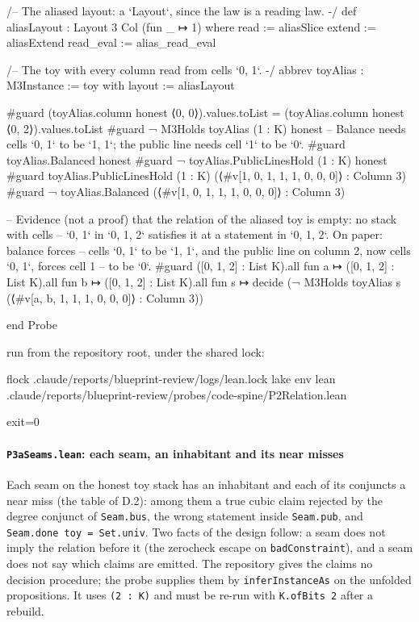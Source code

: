 \begin{leancode}
/-- The aliased layout: a `Layout`, since the law is a reading law. -/
def aliasLayout : Layout 3 Col (fun _ ↦ 1) where
  read := aliasSlice
  extend := aliasExtend
  read_eval := alias_read_eval

/-- The toy with every column read from cells `0, 1`. -/
abbrev toyAlias : M3Instance := { toy with layout := aliasLayout }

#guard (toyAlias.column honest ⟨0, 0⟩).values.toList = (toyAlias.column honest ⟨0, 2⟩).values.toList
#guard ¬ M3Holds toyAlias (1 : K) honest
-- Balance needs cells `0, 1` to be `1, 1`; the public line needs cell `1` to be `0`.
#guard toyAlias.Balanced honest
#guard ¬ toyAlias.PublicLinesHold (1 : K) honest
#guard toyAlias.PublicLinesHold (1 : K) (⟨#v[1, 0, 1, 1, 1, 0, 0, 0]⟩ : Column 3)
#guard ¬ toyAlias.Balanced (⟨#v[1, 0, 1, 1, 1, 0, 0, 0]⟩ : Column 3)

-- Evidence (not a proof) that the relation of the aliased toy is empty: no stack with cells
-- `0, 1` in `{0, 1, 2}` satisfies it at a statement in `{0, 1, 2}`. On paper: balance forces
-- cells `0, 1` to be `1, 1`, and the public line on column 2, now cells `0, 1`, forces cell 1
-- to be `0`.
#guard ([0, 1, 2] : List K).all fun a ↦ ([0, 1, 2] : List K).all fun b ↦
  ([0, 1, 2] : List K).all fun s ↦
    decide (¬ M3Holds toyAlias s (⟨#v[a, b, 1, 1, 1, 0, 0, 0]⟩ : Column 3))

end Probe
\end{leancode}

run from the repository root, under the shared lock:

\begin{shellcode}
flock .claude/reports/blueprint-review/logs/lean.lock lake env lean .claude/reports/blueprint-review/probes/code-spine/P2Relation.lean
\end{shellcode}


\begin{srccode}
exit=0
\end{srccode}

\paragraph{\texttt{P3aSeams.lean}: each seam, an inhabitant and its near misses}\label{sec:gen-probe-spine-P3aSeams}

Each seam on the honest toy stack has an inhabitant and each of its conjuncts a near miss (the table of D.2): among them a true cubic claim rejected by the degree conjunct of \texttt{Seam.\allowbreak{}bus}, the wrong statement inside \texttt{Seam.\allowbreak{}pub}, and \texttt{Seam.\allowbreak{}done toy = Set.\allowbreak{}univ}. Two facts of the design follow: a seam does not imply the relation before it (the zerocheck escape on \texttt{badConstraint}), and a seam does not say which claims are emitted. The repository gives the claims no decision procedure; the probe supplies them by \texttt{inferInstanceAs} on the unfolded propositions. It uses \texttt{(\allowbreak{}2 : K)} and must be re-run with \texttt{K.\allowbreak{}ofBits 2} after a rebuild.

